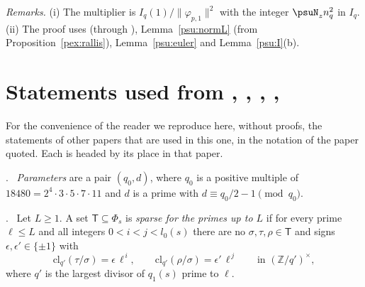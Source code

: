 \documentclass[10pt]{amsart}
\theoremstyle{definition}
\theoremstyle{remark}
\providecommand{\anPl}{\Phi}
\providecommand{\ancl}{\mathrm{cl}}
\newenvironment{quoteddef}[2]{\par\medskip\noindent\begingroup
  \textbf{#1}#2.\ \ignorespaces}{\endgroup\par\medskip}
\begin{document}
\emph{Remarks.} (i) The multiplier is $I_q(1)/\|\varphi_{p,1}\|^2$ with the integer $\psuN_zn_q^2$ in $I_q$.
(ii) The proof uses {\cite[Theorem~9.1]{P53}} (through {\cite[Theorem~7.9]{P49}}), Lemma~\ref{psu:normL} (from Proposition~\ref{pex:rallis}), Lemma~\ref{psu:euler} and Lemma~\ref{psu:I}(b).



\appendix

\section{Statements used from \texorpdfstring{\cite{P46}}{[P46]}, \texorpdfstring{\cite{P49}}{[P49]}, \texorpdfstring{\cite{P51}}{[P51]}, \texorpdfstring{\cite{P53}}{[P53]}, \texorpdfstring{\cite{P55}}{[P55]}}\label{C2:quoted}

For the convenience of the reader we reproduce here, without proofs, the statements of other papers that are used in this one, in the notation of the paper quoted. Each is headed by its place in that paper.

\begin{quoteddef}{\cite[Definition~13.1]{P46}}{}
\emph{Parameters} are a pair $(q_0,d)$, where $q_0$ is a positive multiple of
$18480=2^4\cdot3\cdot5\cdot7\cdot11$ and $d$ is a prime with
$d\equiv q_0/2-1\pmod{q_0}$.
\end{quoteddef}

\begin{quoteddef}{\cite[Definition~13.2]{P46}}{}
Let $L\ge1$. A set $\mathsf T\subseteq\anPl_s$ is \emph{sparse for the primes
up to $L$} if for every prime $\ell\le L$ and all integers $0<i<j<l_0(s)$
there are no $\sigma,\tau,\rho\in\mathsf T$ and signs
$\epsilon,\epsilon'\in\{\pm1\}$ with
\[
 \ancl_{q'}(\tau/\sigma)=\epsilon\,\ell^{\,i},\qquad \ancl_{q'}(\rho/\sigma)=\epsilon'\,\ell^{\,j}\qquad\text{in }(\mathbb Z/q')^{\times},
\]
where $q'$ is the largest divisor of $q_1(s)$ prime to $\ell$.
\end{quoteddef}
\end{document}

